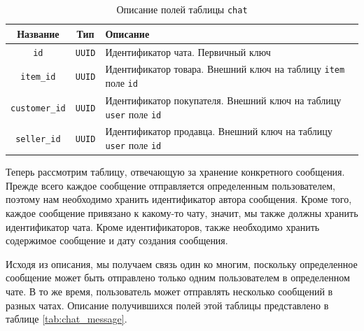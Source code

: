 \documentclass[a4paper,14pt]{extarticle}
\begin{document}
\begin{center}
    \begin{longtable}{|c|c|>{\centering\arraybackslash}m{11.2cm}|}
        \caption{Описание полей таблицы \texttt{chat}}
        \label{tab:chat}
        \\
        \hline
        \textbf{Название}     & \textbf{Тип}  & \textbf{Описание}                                                                \\
        \hline
        \texttt{id}           & \texttt{UUID} & Идентификатор чата. Первичный ключ                                               \\
        \hline
        \texttt{item\_id}     & \texttt{UUID} & Идентификатор товара. Внешний ключ на таблицу \texttt{item} поле \texttt{id}     \\
        \hline
        \texttt{customer\_id} & \texttt{UUID} & Идентификатор покупателя. Внешний ключ на таблицу \texttt{user} поле \texttt{id} \\
        \hline
        \texttt{seller\_id}   & \texttt{UUID} & Идентификатор продавца. Внешний ключ на таблицу \texttt{user} поле \texttt{id}   \\
        \hline
    \end{longtable}
\end{center}

Теперь рассмотрим таблицу, отвечающую за хранение конкретного сообщения. Прежде всего каждое сообщение отправляется определенным пользователем, поэтому нам необходимо хранить идентификатор автора сообщения. Кроме того, каждое сообщение привязано к какому-то чату, значит, мы также должны хранить идентификатор чата. Кроме идентификаторов, также необходимо хранить содержимое сообщение и дату создания сообщения.

Исходя из описания, мы получаем связь один ко многим, поскольку определенное сообщение может быть отправлено только одним пользователем в определенном чате. В то же время, пользователь может отправлять несколько сообщений в разных чатах. Описание получившихся полей этой таблицы представлено в таблице \ref{tab:chat_message}.
\end{document}

